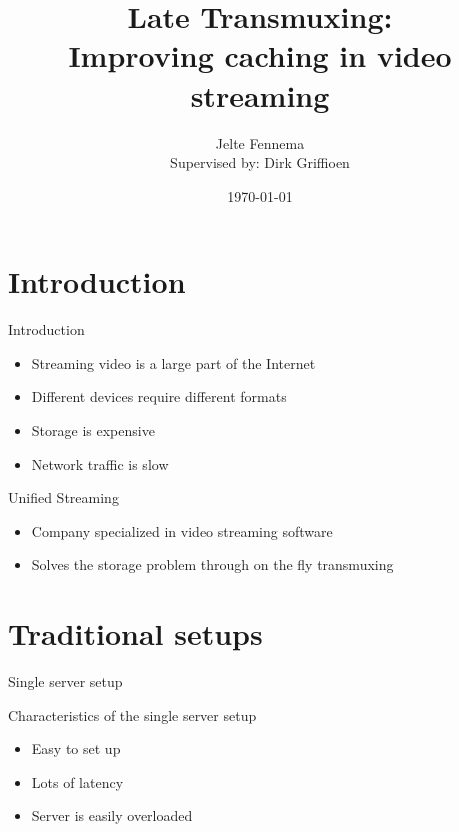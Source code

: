 \documentclass[xcolor=svgnames,handout]{beamer}
\title[Late Transmuxing\hspace{2em}]{Late Transmuxing:\\Improving caching in video streaming}
\author[Jelte Fennema]{Jelte Fennema\\\footnotesize{Supervised by: Dirk Griffioen}}
\date{\today}
\institute{University of Amsterdam}
\begin{document}
\maketitle

\section{Introduction}

\begin{frame}{Introduction}
  \begin{itemize}
      \item Streaming video is a large part of the Internet
      \item Different devices require different formats
      \item Storage is expensive
      \item Network traffic is slow
  \end{itemize}
\end{frame}

\begin{frame}{Unified Streaming}
  \begin{itemize}
      \item Company specialized in video streaming software
      \item Solves the storage problem through on the fly transmuxing
  \end{itemize}
\end{frame}

\section{Traditional setups}

\begin{frame}{Single server setup}
    \begin{figure}

        \resizebox{\textwidth}{!}{%
            
        }
    \end{figure}
\end{frame}
\begin{frame}{Characteristics of the single server setup}
    \begin{itemize}
        \item Easy to set up

        \item Lots of latency

        \item Server is easily overloaded

    \end{itemize}
\end{frame}
\end{document}
